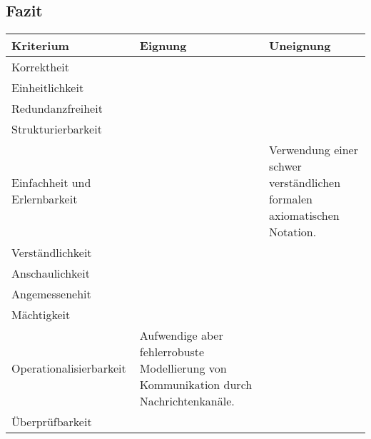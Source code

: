 \subsection{Fazit}
\label{scc:SDL_Fazit}
\begin{tabularx}{\textwidth}{|l|l|l|}
	\hline
	Kriterium & Eignung & Uneignung  \\
	\hline
	Korrektheit	& & \\
	\hline
	Einheitlichkeit & & \\
	\hline
	Redundanzfreiheit & & \\
	\hline	
	Strukturierbarkeit & & \\
	\hline
	Einfachheit und 
	Erlernbarkeit & & Verwendung einer schwer verständlichen formalen axiomatischen Notation.  \\
	\hline
	Verständlichkeit & & \\
	\hline
	Anschaulichkeit & & \\
	\hline	
	Angemessenehit 	& & \\
	\hline
	Mächtigkeit & & \\
	\hline
	Operationalisierbarkeit & Aufwendige aber fehlerrobuste	Modellierung von Kommunikation durch Nachrichtenkanäle. & \\
	\hline
	Überprüfbarkeit & & \\
	\hline
\end{tabularx} 
